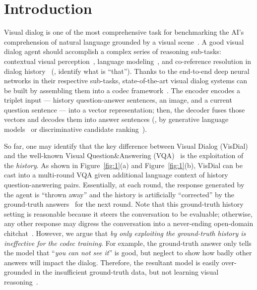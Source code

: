 \documentclass[10pt,twocolumn,letterpaper]{article}
\begin{document}
\section{Introduction}
Visual dialog is one of the most comprehensive task for benchmarking the AI's comprehension of natural language grounded by a visual scene~\cite{das2017visual}. A good visual dialog agent should accomplish a complex series of reasoning sub-tasks: contextual visual perception~\cite{wu2017you,lu2017best,das2017human,seo2017visual,kottur2018visual,yang2016stacked,shih2016look}, language modeling~\cite{hochreiter1997long,chung2014empirical}, and co-reference resolution in dialog history~\cite{seo2017visual,kottur2018visual} (\eg, identify what is ``that''). Thanks to the end-to-end deep neural networks in their respective sub-tasks, state-of-the-art visual dialog systems can be built by assembling them into a codec framework~\cite{wu2017you,das2017visual,lu2017best}. The encoder encodes a triplet input --- history question-answer sentences, an image, and a current question sentence --- into a vector representation; then, the decoder fuses those vectors and decodes them into answer sentences (\eg, by generative language models~\cite{das2017visual,lu2017best,wu2017you} or discriminative candidate ranking~\cite{jain2018two,kottur2018visual}).

So far, one may identify that the key difference between Visual Dialog (VisDial) and the well-known Visual Question\&Answering (VQA)~\cite{antol2015vqa} is the exploitation of the \emph{history}. As shown in Figure~\ref{fig:1}(a) and Figure~\ref{fig:1}(b), VisDial can be cast into a multi-round VQA given additional language context of history question-answering pairs. Essentially, at each round, the response generated by the agent is ``thrown away'' and the history is artificially ``corrected'' by the ground-truth answers~\cite{das2017visual} for the next round. Note that this ground-truth history setting is reasonable because it steers the conversation to be evaluable; otherwise, any other response may digress the conversation into a never-ending open-domain chitchat~\cite{quarteroni2009designing,higashinaka2014towards}. However, we argue that \emph{by only exploiting the ground-truth history is ineffective for the codec training}. For example, the ground-truth answer only tells the model that ``\emph{you can not see it}'' is good, but neglect to show how badly other answers will impact the dialog. Therefore, the resultant model is easily over-grounded in the insufficient ground-truth data, but not learning visual reasoning~\cite{lake2017building}. 
\end{document}
